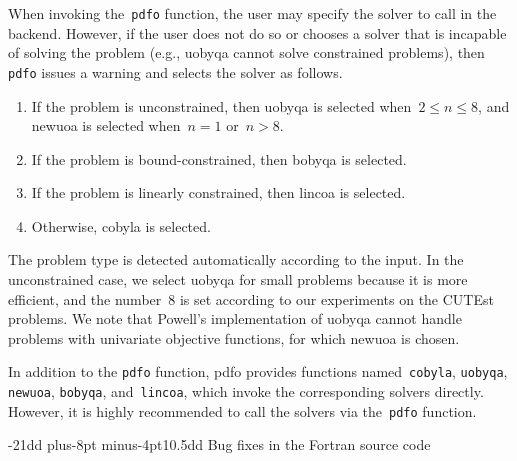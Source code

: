 \documentclass[
    smallextended,  %
    final,          %
]{svjour3}
\makeatletter
\newcommand{\pdfofun}{\texttt{pdfo}\xspace}
\newcommand{\cobylafun}{\texttt{cobyla}\xspace}
\newcommand{\newuoafun}{\texttt{newuoa}\xspace}
\newcommand{\bobyqafun}{\texttt{bobyqa}\xspace}
\newcommand{\lincoafun}{\texttt{lincoa}\xspace}
\def\subsection{\@startsection{subsection}{2}{\z@}%
    {-21dd plus-8pt minus-4pt}{10.5dd}
     {\normalsize\bfseries}}
\makeatother
\begin{document}
When invoking the~\pdfofun function, the user may specify the solver to call in the backend.
However, if the user does not do so or chooses a solver that is incapable of solving the problem (e.g., \gls{uobyqa} cannot solve
constrained problems), then \pdfofun issues a warning and selects the solver as follows.
\begin{enumerate}
    \item If the problem is unconstrained, then \gls{uobyqa} is selected when~$2 \le n \le 8$, and \gls{newuoa} is selected when~$n = 1$ or~$n > 8$.
    \item If the problem is bound-constrained, then \gls{bobyqa} is selected.
    \item If the problem is linearly constrained, then \gls{lincoa} is selected.
    \item Otherwise, \gls{cobyla} is selected.
\end{enumerate}
The problem type is detected automatically according to the input.
In the unconstrained case, we select \gls{uobyqa} for small problems because it is more efficient,
and the number~$8$ is set according to our experiments on the CUTEst~\cite{Gould_Orban_Toint_2015} problems.
We note that Powell's implementation of \gls{uobyqa} cannot handle problems with univariate
objective functions, for which \gls{newuoa} is chosen.

In addition to the \pdfofun function, \gls{pdfo} provides functions named~\cobylafun,
\texttt{uobyqa}, \newuoafun, \bobyqafun, and~\lincoafun, which invoke the
corresponding solvers directly. However, it is highly recommended to call the solvers
via the~\pdfofun function.

\subsection{Bug fixes in the Fortran source code}
\label{subsec:bug-corrections}
\end{document}
